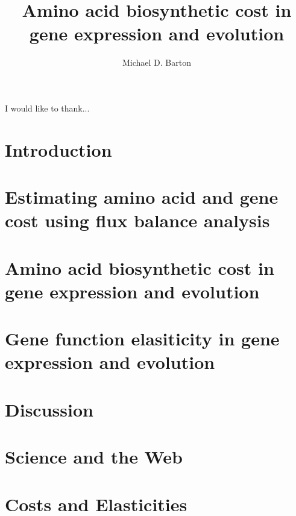 \documentclass[12pt,PhD]{muthesis}
\begin{document}
\title{Amino acid biosynthetic cost in gene expression and evolution}
\author{Michael D. Barton}

\beforeabstract
{}

\afterabstract
{}
I would like to thank...
\afterpreface


\chapter{Introduction}

\chapter{Estimating amino acid and gene cost using flux balance analysis}

\chapter{Amino acid biosynthetic cost in gene expression and evolution}

\chapter{Gene function elasiticity in gene expression and evolution}

\chapter{Discussion}





\appendix
\addappheadtotoc
\appendixpage
\chapter{Science and the Web}

\chapter{Costs and Elasticities}

\end{document}
